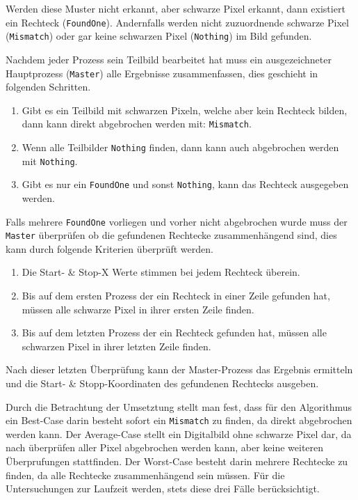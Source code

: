 Werden diese Muster nicht erkannt, aber schwarze Pixel erkannt, dann existiert ein Rechteck (\texttt{FoundOne}). Andernfalls werden nicht zuzuordnende schwarze Pixel (\texttt{Mismatch}) oder gar keine schwarzen Pixel (\texttt{Nothing}) im Bild gefunden.

Nachdem jeder Prozess sein Teilbild bearbeitet hat muss ein ausgezeichneter Hauptprozess (\texttt{Master}) alle Ergebnisse zusammenfassen, dies geschieht in folgenden Schritten.

\begin{enumerate}
	\item Gibt es ein Teilbild mit schwarzen Pixeln, welche aber kein Rechteck bilden, dann kann direkt abgebrochen werden mit: \texttt{Mismatch}.
	\item Wenn alle Teilbilder \texttt{Nothing} finden, dann kann auch abgebrochen werden mit \texttt{Nothing}.
	\item Gibt es nur ein \texttt{FoundOne} und sonst \texttt{Nothing}, kann das Rechteck ausgegeben werden.
\end{enumerate}

Falls mehrere \texttt{FoundOne} vorliegen und vorher nicht abgebrochen wurde muss der \texttt{Master} überprüfen ob die gefundenen Rechtecke zusammenhängend sind, dies kann durch folgende Kriterien überprüft werden.

\begin{enumerate}
	\item Die Start- \& Stop-X Werte stimmen bei jedem Rechteck überein.
	\item Bis auf dem ersten Prozess der ein Rechteck in einer Zeile gefunden hat, müssen alle schwarze Pixel in ihrer ersten Zeile finden.
	\item Bis auf dem letzten Prozess der ein Rechteck gefunden hat, müssen alle schwarzen Pixel in ihrer letzten Zeile finden.
\end{enumerate}

Nach dieser letzten Überprüfung kann der Master-Prozess das Ergebnis ermitteln und die Start- \& Stopp-Koordinaten des gefundenen Rechtecks ausgeben. 

Durch die Betrachtung der Umsetztung stellt man fest, dass für den Algorithmus ein Best-Case darin besteht sofort ein \texttt{Mismatch} zu finden, da direkt abgebrochen werden kann. Der Average-Case stellt ein Digitalbild ohne schwarze Pixel dar, da nach überprüfen aller Pixel abgebrochen werden kann, aber keine weiteren Überprufungen stattfinden. Der Worst-Case besteht darin mehrere Rechtecke zu finden, da alle Rechtecke zusammenhängend sein müssen. Für die Untersuchungen zur Laufzeit werden, stets diese drei Fälle berücksichtigt.


